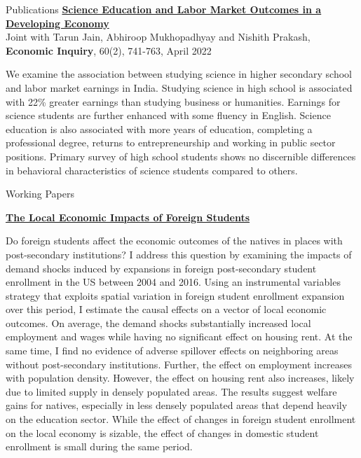 \documentclass{resume} %
\begin{document}
\begin{rSection}{Publications}
	\vspace{.5em}
	\href{https://onlinelibrary.wiley.com/doi/abs/10.1111/ecin.13044}{\bf {\color{dark}Science Education and Labor Market Outcomes in a Developing Economy}} \\
	Joint with Tarun Jain, Abhiroop Mukhopadhyay and Nishith Prakash, \textbf{Economic Inquiry}, 60(2), 741-763, April 2022
	
	
	We examine the association between studying science in higher secondary school and labor market earnings in India. Studying science in high school is associated with 22\% greater earnings than studying business or humanities. Earnings for science students are further enhanced with some fluency in English. Science education is also associated with more years of education, completing a professional degree, returns to entrepreneurship and working in public sector positions. Primary survey of high school students shows no discernible differences in behavioral characteristics of science students compared to others.
	
	\vspace{.5em}
\end{rSection}

\begin{rSection}{Working Papers}
	\vspace{.5em}
	
	\href{}{\bf {\color{dark}The Local Economic Impacts of Foreign Students}}
	
	Do foreign students affect the economic outcomes of the natives in places with post-secondary institutions? I address this question by examining the impacts of demand shocks induced by expansions in foreign post-secondary student enrollment in the US between 2004 and 2016. Using an instrumental variables strategy that exploits spatial variation in foreign student enrollment expansion over this period, I estimate the causal effects on a vector of local economic outcomes. On average, the demand shocks substantially increased local employment and wages while having no significant effect on housing rent. At the same time, I find no evidence of adverse spillover effects on neighboring areas without post-secondary institutions. Further, the effect on employment increases with population density. However, the effect on housing rent also increases, likely due to limited supply in densely populated areas. The results suggest welfare gains for natives, especially in less densely populated areas that depend heavily on the education sector. While the effect of changes in foreign student enrollment on the local economy is sizable, the effect of changes in domestic student enrollment is small during the same period.
	
	\vspace{.5em}
	
	
\end{rSection}
\end{document}
